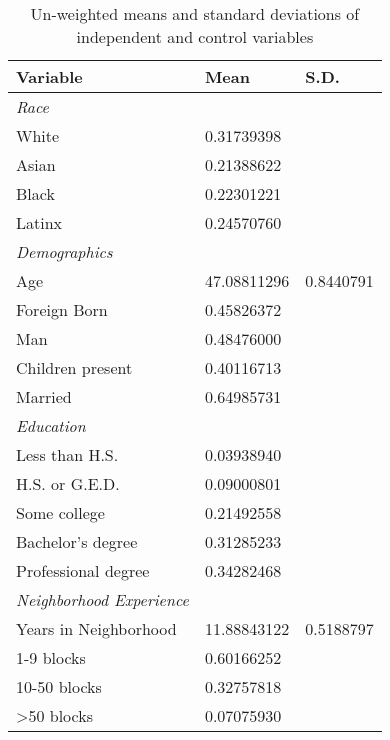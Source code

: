 % 
\begin{table}[ht]
\centering
\caption{Un-weighted means and standard deviations of independent and control variables} 
\label{tab:descriptives}
\begin{tabular}{lp{.5in}p{.5in}}
  \toprule
Variable & Mean & S.D. \\ 
  \midrule
\emph{Race}&&\\White &  0.31739398 &  \\ 
  Asian &  0.21388622 &  \\ 
  Black &  0.22301221 &  \\ 
  Latinx &  0.24570760 &  \\ 
  \emph{Demographics}&&\\Age & 47.08811296 & 0.8440791 \\ 
  Foreign Born &  0.45826372 &  \\ 
  Man &  0.48476000 &  \\ 
  Children present &  0.40116713 &  \\ 
  Married &  0.64985731 &  \\ 
  \emph{Education}&&\\Less than H.S. &  0.03938940 &  \\ 
  H.S. or G.E.D. &  0.09000801 &  \\ 
  Some college &  0.21492558 &  \\ 
  Bachelor's degree &  0.31285233 &  \\ 
  Professional degree &  0.34282468 &  \\ 
  \emph{Neighborhood Experience}\\Years in Neighborhood & 11.88843122 & 0.5188797 \\ 
  1-9 blocks &  0.60166252 &  \\ 
  10-50 blocks &  0.32757818 &  \\ 
  >50 blocks &  0.07075930 &  \\ 
   \bottomrule
\end{tabular}
\end{table}
